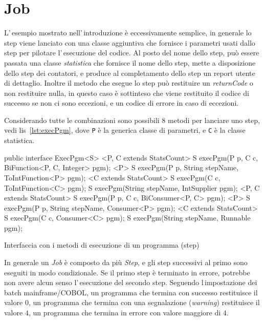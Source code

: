 \chapter{Job}

L'\,esempio mostrato nell'\,introduzione è eccessivamente semplice, in generale
lo step viene lanciato con una classe aggiuntiva che fornisce i parametri usati
dallo step per pilotare l'\,esecuzione del codice.
Al posto del nome dello step, può essere passata una classe \textsl{statistica}
che fornisce il nome dello step, mette a disposizione dello step dei contatori,
e produce al completamento dello step un report utente di dettaglio.
Inoltre il metodo che esegue lo step può restituire un \textsl{returnCode} o
non restituire nulla, in questo caso è sottinteso che viene restituito il codice
di successo se non ci sono eccezioni, e un codice di errore in caso di
eccezioni.

Considerando tutte le combinazioni sono possibili 8 metodi per lanciare uno
step, vedi lis~\ref{lst:execPgm}, dove \texttt{P} è la generica classe di
parametri, e \texttt{C} è la classe statistica.
\begin{elisting}[!htb]
\begin{javacode}
public interface ExecPgm<S> {
    <P, C extends StatsCount> S execPgm(P p, C c, BiFunction<P, C, Integer> pgm);
    <P> S execPgm(P p, String stepName, ToIntFunction<P> pgm);
    <C extends StatsCount> S execPgm(C c, ToIntFunction<C> pgm);
    S execPgm(String stepName, IntSupplier pgm);
    <P, C extends StatsCount> S execPgm(P p, C c, BiConsumer<P, C> pgm);
    <P> S execPgm(P p, String stepName, Consumer<P> pgm);
    <C extends StatsCount> S execPgm(C c, Consumer<C> pgm);
    S execPgm(String stepName, Runnable pgm);
}
\end{javacode}
\caption{Interfaccia con i metodi di esecuzione di un programma (step)}
\label{lst:execPgm}
\end{elisting}

In generale un \textit{Job} è composto da più \textit{Step}, e gli step
successivi al primo sono eseguiti in modo condizionale.
Se il primo step è terminato in errore, potrebbe non avere alcun senso
l'\,esecuzione del secondo step.
Seguendo l\,impostazione dei batch mainframe/COBOL, un programma che termina con
successo restituisce il valore $0$, un programma che termina con una
segnalazione (\textit{warning}) restituisce il valore $4$, un programma che
termina in errore con valore maggiore di $4$.



